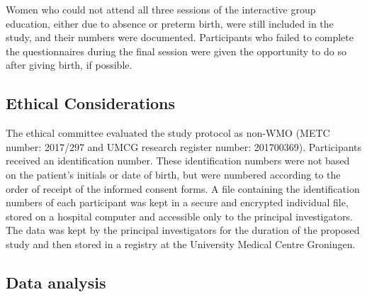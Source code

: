 \documentclass[12pt]{article}
\begin{document}
\noindent Women who could not attend all three sessions of the interactive group education, either due to absence or preterm birth, were still included in the study, and their numbers were documented. Participants who failed to complete the questionnaires during the final session were given the opportunity to do so after giving birth, if possible.

\subsection{Ethical Considerations}

\noindent The ethical committee evaluated the study protocol as non-WMO (METC number: 2017/297 and UMCG research register number: 201700369). Participants received an identification number. These identification numbers were not based on the patient's initials or date of birth, but were numbered according to the order of receipt of the informed consent forms. A file containing the identification numbers of each participant was kept in a secure and encrypted individual file, stored on a hospital computer and accessible only to the principal investigators. The data was kept by the principal investigators for the duration of the proposed study and then stored in a registry at the University Medical Centre Groningen.

\subsection{Data analysis}
\end{document}
